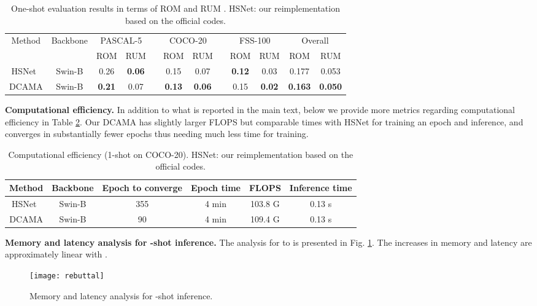 \documentclass[runningheads,table,xcdraw]{llncs}
\begin{document}
{\begin{table}[h]
\caption{One-shot evaluation results in terms of ROM and RUM \cite{zhang2021rethinking}.
HSNet: our reimplementation based on the official codes.}\label{tab:ROM_RUM}
\centering
\begin{tabular}{c|c|cccccccc|cc}
\hline
\multirow{2}{*}{Method} & \multirow{2}{*}{Backbone} & \multicolumn{2}{c}{PASCAL-5} &  & \multicolumn{2}{c}{COCO-20} &  & \multicolumn{2}{c|}{FSS-100} & \multicolumn{2}{c}{Overall} \\ \cline{3-4} \cline{6-7} \cline{9-12}
                        &                           & ROM             & RUM            &  & ROM            & RUM            &  & ROM           & RUM          & ROM          & RUM          \\ \hline
HSNet~\cite{min2021hypercorrelation} & Swin-B                    & 0.26            & \textbf{0.06}           &  & 0.15           & 0.07           &  & \textbf{0.12}          & 0.03         & 0.177 & 0.053 \\
DCAMA                   & Swin-B                    & \textbf{0.21}            & 0.07           &  & \textbf{0.13}           & \textbf{0.06}           &  & 0.15          & \textbf{0.02}         & \textbf{0.163} & \textbf{0.050} \\ \hline
\end{tabular}
\end{table}

\textbf{Computational efficiency.}
In addition to what is reported in the main text, below we provide more metrics regarding computational efficiency in Table \ref{tab:efficiency}.
Our DCAMA has slightly larger FLOPS but comparable times with HSNet for training an epoch and inference, and converges in substantially fewer epochs thus needing much less time for training.

\begin{table}[h]
    \caption{Computational efficiency (1-shot on COCO-20).
    HSNet: our reimplementation based on the official codes.}
    \label{tab:efficiency}
    \centering
    \begin{tabular}{cccccc}
    \hline
        Method & Backbone & Epoch to converge & Epoch time & FLOPS & Inference time \\ \hline
        HSNet~\cite{min2021hypercorrelation}  & Swin-B   &355                & 4 min            &103.8 G       &0.13 s                \\
        DCAMA  & Swin-B   &90     & 4 min            &109.4 G       &0.13 s                \\ \hline
    \end{tabular}
\end{table}

{\bf Memory and latency analysis for -shot inference.}
The analysis for  to  is presented in Fig. \ref{fig:latency}.
The increases in memory and latency are approximately linear with .

\begin{figure}[t]
  \centering
\texttt{[image: rebuttal]}
   \caption{Memory and latency analysis for -shot inference.}
   \label{fig:latency}
\end{figure}
}
\end{document}
